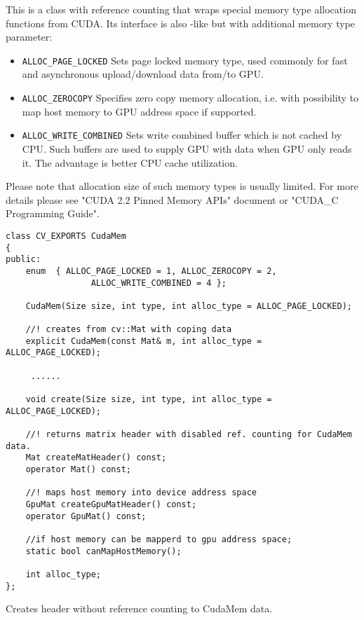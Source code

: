 This is a class with reference counting that wraps special memory type allocation functions from CUDA. Its interface is also -like but with additional memory type parameter:
\begin{itemize}
    \item \texttt{ALLOC\_PAGE\_LOCKED} Sets page locked memory type, used commonly for fast and asynchronous upload/download data from/to GPU.
    \item \texttt{ALLOC\_ZEROCOPY} Specifies zero copy memory allocation, i.e. with possibility to map host memory to GPU address space if supported.
    \item \texttt{ALLOC\_WRITE\_COMBINED} Sets write combined buffer which is not cached by CPU. Such buffers are used to supply GPU with data when GPU only reads it. The advantage is better CPU cache utilization.
\end{itemize}
Please note that allocation size of such memory types is usually limited. For more details please see "CUDA 2.2 Pinned Memory APIs" document or "CUDA\_C Programming Guide".

\begin{lstlisting}
class CV_EXPORTS CudaMem
{
public:
	enum  { ALLOC_PAGE_LOCKED = 1, ALLOC_ZEROCOPY = 2,
                 ALLOC_WRITE_COMBINED = 4 };

	CudaMem(Size size, int type, int alloc_type = ALLOC_PAGE_LOCKED);

	//! creates from cv::Mat with coping data
	explicit CudaMem(const Mat& m, int alloc_type = ALLOC_PAGE_LOCKED);

	 ......

	void create(Size size, int type, int alloc_type = ALLOC_PAGE_LOCKED);

	//! returns matrix header with disabled ref. counting for CudaMem data.
	Mat createMatHeader() const;
	operator Mat() const;

	//! maps host memory into device address space
	GpuMat createGpuMatHeader() const;
	operator GpuMat() const;

	//if host memory can be mapperd to gpu address space;
	static bool canMapHostMemory();

	int alloc_type;
};

\end{lstlisting}

Creates  header without reference counting to CudaMem data.


